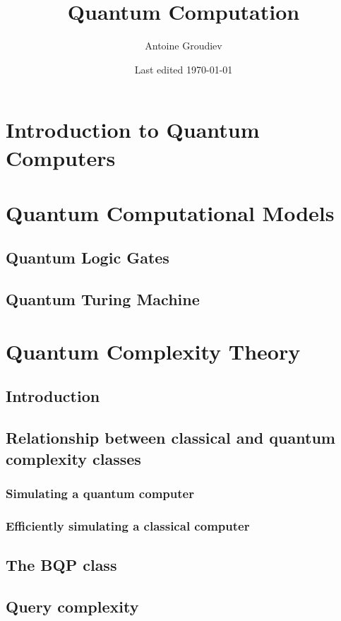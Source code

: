 \documentclass[12pt,a4paper]{article}
\title{\vspace{-3ex} \textbf{Quantum Computation}}
\author{Antoine Groudiev}
\date{\vspace{-1ex}Last edited \today}
\begin{document}
\maketitle
\tableofcontents

\section*{Introduction to Quantum Computers}

\section{Quantum Computational Models}
\subsection{Quantum Logic Gates}

\subsection{Quantum Turing Machine}

\section{Quantum Complexity Theory}
\subsection{Introduction}
\subsection{Relationship between classical and quantum complexity classes}
\subsubsection{Simulating a quantum computer}
\subsubsection{Efficiently simulating a classical computer}

\subsection{The BQP class}
\subsection{Query complexity}
\end{document}
